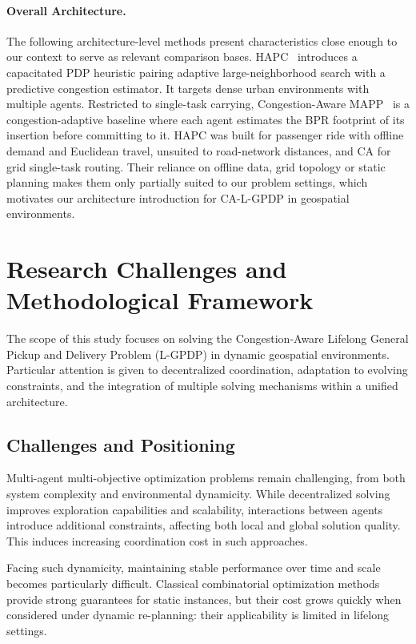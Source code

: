 \documentclass[sigconf]{acmart}
\begin{document}
\paragraph{Overall Architecture.}
The following architecture-level methods present characteristics close enough to our context to serve as relevant comparison bases. HAPC~\cite{cortes2009} introduces a capacitated PDP heuristic pairing adaptive large-neighborhood search with a predictive congestion estimator. It targets dense urban environments with multiple agents. Restricted to single-task carrying, Congestion-Aware MAPP~\cite{asadi2025} is a congestion-adaptive baseline where each agent estimates the BPR footprint of its insertion before committing to it. HAPC was built for passenger ride with offline demand and Euclidean travel, unsuited to road-network distances, and CA for grid single-task routing. Their reliance on offline data, grid topology or static planning makes them only partially suited to our problem settings, which motivates our architecture introduction for CA-L-GPDP in geospatial environments.

\section{Research Challenges and Methodological Framework}
\label{sec:methodology}

The scope of this study focuses on solving the Congestion-Aware Lifelong General Pickup and Delivery Problem (L-GPDP) in dynamic geospatial environments. Particular attention is given to decentralized coordination, adaptation to evolving constraints, and the integration of multiple solving mechanisms within a unified architecture. 

\subsection{Challenges and Positioning}

Multi-agent multi-objective optimization problems remain challenging, from both system complexity and environmental dynamicity. While decentralized solving improves exploration capabilities and scalability, interactions between agents introduce additional constraints, affecting both local and global solution quality. This induces increasing coordination cost in such approaches.

Facing such dynamicity, maintaining stable performance over time and scale becomes particularly difficult. Classical combinatorial optimization methods provide strong guarantees for static instances, but their cost grows quickly when considered under dynamic re-planning: their applicability is limited in lifelong settings.
\end{document}
